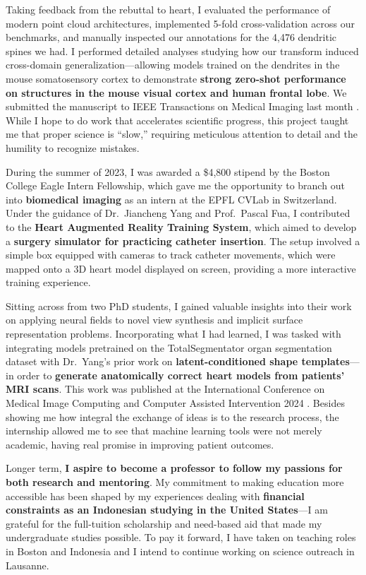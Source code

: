 \documentclass[letterpaper,11pt]{article}
\begin{document}
Taking feedback from the rebuttal to heart, I evaluated the performance of modern point cloud architectures, implemented 5-fold cross-validation across our benchmarks, and manually inspected our annotations for the 4,476 dendritic spines we had. I performed detailed analyses studying how our transform induced cross-domain generalization---allowing models trained on the dendrites in the mouse somatosensory cortex to demonstrate \textbf{strong zero-shot performance on structures in the mouse visual cortex and human frontal lobe}. We submitted the manuscript to IEEE Transactions on Medical Imaging last month . While I hope to do work that accelerates scientific progress, this project taught me that proper science is “slow,” requiring meticulous attention to detail and the humility to recognize mistakes.

During the summer of 2023, I was awarded a \$4,800 stipend by the Boston College Eagle Intern Fellowship, which gave me the opportunity to branch out into \textbf{biomedical imaging} as an intern at the EPFL CVLab in Switzerland. Under the guidance of Dr.\ Jiancheng Yang and Prof.\ Pascal Fua, I contributed to the \textbf{Heart Augmented Reality Training System}, which aimed to develop a \textbf{surgery simulator for practicing catheter insertion}. The setup involved a simple box equipped with cameras to track catheter movements, which were mapped onto a 3D heart model displayed on screen, providing a more interactive training experience.

Sitting across from two PhD students, I gained valuable insights into their work on applying neural fields to novel view synthesis and implicit surface representation problems. Incorporating what I had learned, I was tasked with integrating models pretrained on the TotalSegmentator organ segmentation dataset with Dr.\ Yang’s prior work on \textbf{latent-conditioned shape templates}---in order to \textbf{generate anatomically correct heart models from patients’ MRI scans}. This work was published at the International Conference on Medical Image Computing and Computer Assisted Intervention 2024 . Besides showing me how integral the exchange of ideas is to the research process, the internship allowed me to see that machine learning tools were not merely academic, having real promise in improving patient outcomes.

Longer term, \textbf{I aspire to become a professor to follow my passions for both research and mentoring}. My commitment to making education more accessible has been shaped by my experiences dealing with \textbf{financial constraints as an Indonesian studying in the United States}---I am grateful for the full-tuition scholarship and need-based aid that made my undergraduate studies possible. To pay it forward, I have taken on teaching roles in Boston and Indonesia and I intend to continue working on science outreach in Lausanne.
\end{document}
